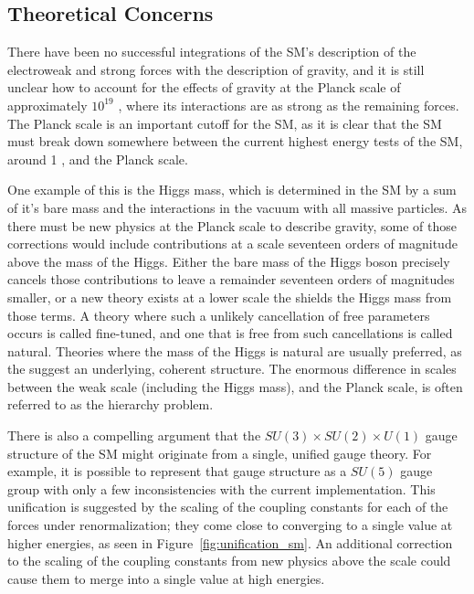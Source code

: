 \subsection{Theoretical Concerns}

There have been no successful integrations of the \ac{SM}'s description of the electroweak and strong forces with the description of gravity, and it is still unclear how to account for the effects of gravity at the Planck scale of approximately $10^{19}$ \GeV, where its interactions are as strong as the remaining forces.
The Planck scale is an important cutoff for the \ac{SM}, as it is clear that the \ac{SM} must break down somewhere between the current highest energy tests of the \ac{SM}, around 1 \TeV, and the Planck scale.

One example of this is the Higgs mass, which is determined in the \ac{SM} by a sum of it's bare mass and the interactions in the vacuum with all massive particles.
As there must be new physics at the Planck scale to describe gravity, some of those corrections would include contributions at a scale seventeen orders of magnitude above the mass of the Higgs.
Either the bare mass of the Higgs boson precisely cancels those contributions to leave a remainder seventeen orders of magnitudes smaller, or a new theory exists at a lower scale the shields the Higgs mass from those terms.
A theory where such a unlikely cancellation of free parameters occurs is called fine-tuned, and one that is free from such cancellations is called natural.
Theories where the mass of the Higgs is natural are usually preferred, as the suggest an underlying, coherent structure.
The enormous difference in scales between the weak scale (including the Higgs mass), and the Planck scale, is often referred to as the hierarchy problem.

There is also a compelling argument that the $SU(3)\times SU(2) \times U(1)$ gauge structure of the \ac{SM} might originate from a single, unified gauge theory.
For example, it is possible to represent that gauge structure as a $SU(5)$ gauge group with only a few inconsistencies with the current implementation.
This unification is suggested by the scaling of the coupling constants for each of the forces under renormalization; they come close to converging to a single value at higher energies, as seen in Figure~\ref{fig:unification_sm}. 
An additional correction to the scaling of the coupling constants from new physics above the \TeV scale could cause them to merge into a single value at high energies. 


